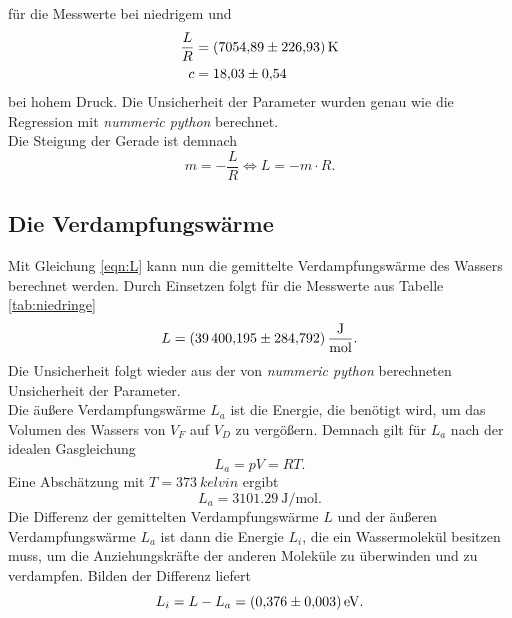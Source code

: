 für die Messwerte bei niedrigem und
\begin{align}
  \frac{L}{R} &=  \SI{7054.89 \pm 226.93}{\kelvin}\\
  c           & =\num{18.03 \pm 0.54}
\end{align}
bei hohem Druck. Die Unsicherheit der Parameter wurden genau wie die Regression mit \textit{nummeric python} 
berechnet.
\\
Die Steigung der Gerade ist demnach
\begin{equation}
  m=-\frac{L}{R} \Leftrightarrow L=-m\cdot R. \label{eqn:L}
\end{equation}

\subsection{Die Verdampfungswärme}
Mit Gleichung \eqref{eqn:L} kann nun die gemittelte Verdampfungswärme des Wassers berechnet werden.
Durch Einsetzen folgt für die Messwerte aus Tabelle \ref{tab:niedringe}
\begin{equation}
  L=\SI{39400.195\pm284.792}{\joule\per\mole}.
\end{equation}
Die Unsicherheit folgt wieder aus der von \textit{nummeric python} berechneten Unsicherheit der Parameter.
\\
Die äußere Verdampfungswärme $L_a$ ist die Energie, die benötigt wird, um das Volumen des Wassers von
$V_F$ auf $V_D$ zu vergößern. Demnach gilt für $L_a$ nach der idealen Gasgleichung
\begin{equation}
  L_a=pV=RT.
\end{equation}
Eine Abschätzung mit $T=\SI{373}{kelvin}$ ergibt
\begin{equation}
  L_a=\SI{3101.29}{\joule\per\mole}.
\end{equation}
Die Differenz der gemittelten Verdampfungswärme $L$ und der äußeren Verdampfungswärme $L_a$ ist dann 
die Energie $L_i$, die ein Wassermolekül besitzen muss, um die Anziehungskräfte der anderen Moleküle zu überwinden
und zu verdampfen. Bilden der Differenz liefert
\begin{equation}
  L_i=L-L_a=\SI{0.376 \pm 0.003}{\electronvolt}.
\end{equation}

